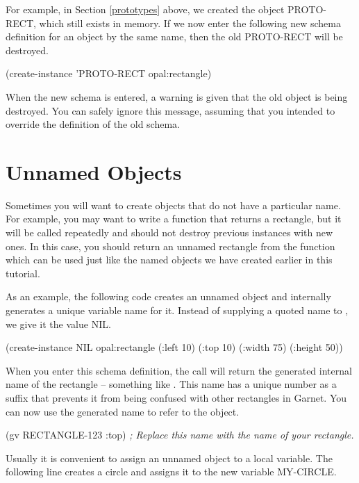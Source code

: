 For example, in Section \ref{prototypes} above, we created the object
PROTO-RECT, which still exists in memory.  If we now enter the
following new schema definition for an object by the same name, then
the old PROTO-RECT will be destroyed.

\begin{programexample}
(create-instance 'PROTO-RECT opal:rectangle)
\end{programexample}

When the new schema is entered, a warning is given that the old object
is being destroyed.  You can safely ignore this message, assuming that
you intended to override the definition of the old schema.


\section{Unnamed Objects}
\label{unnamed-objects}

Sometimes you will want to create objects that do not have a
particular name.  For example, you may want to write a function that
returns a rectangle, but it will be called repeatedly and should not destroy
previous instances with new ones.  In this case, you should return an
unnamed rectangle from the function which can be used just like the
named objects we have created earlier in this tutorial.

As an example, the following code creates an
unnamed object and internally generates a unique variable name for it.
Instead of supplying a quoted name to , we give it
the value NIL.

\begin{programexample}
(create-instance NIL opal:rectangle
   (:left 10) (:top 10) (:width 75) (:height 50))
\end{programexample}

When you enter this schema definition, the  call
will return the generated internal name of the rectangle -- something like
.  This name has a unique number as a
suffix that prevents it from being confused with other rectangles in
Garnet.  You can now use the generated name to refer to the object.

\begin{programexample}
(gv RECTANGLE-123 :top)  {\it ; Replace this name with the name of your rectangle.}
\end{programexample}

Usually it is convenient to assign an unnamed object to a local
variable.  The following line creates a circle and assigns it to the
new variable MY-CIRCLE.

